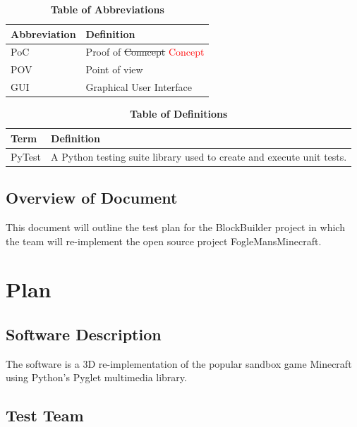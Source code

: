 \documentclass[12pt, titlepage]{article}
\begin{document}
\begin{table}[hbp]
\caption{\textbf{Table of Abbreviations}} \label{Table}

\begin{tabularx}{\textwidth}{p{3cm}X}
\toprule
\textbf{Abbreviation} & \textbf{Definition} \\
\midrule
PoC & Proof of \sout{Conncept} \textcolor{red}{Concept}\\
POV & Point of view\\
GUI & Graphical User Interface\\
\bottomrule
\end{tabularx}

\end{table}

\begin{table}[!htbp]
\caption{\textbf{Table of Definitions}} \label{Table}

\begin{tabularx}{\textwidth}{p{3cm}X}
\toprule
\textbf{Term} & \textbf{Definition}\\
\midrule
PyTest & A Python testing suite library used to create and execute unit tests. \\
\bottomrule
\end{tabularx}

\end{table}	

\subsection{Overview of Document}
This document will outline the test plan for the BlockBuilder project in which the team will re-implement the open source project FogleMansMinecraft.

\section{Plan}
	
\subsection{Software Description}
The software is a 3D re-implementation of the popular sandbox game Minecraft using Python's Pyglet multimedia library.

\subsection{Test Team}
\end{document}
